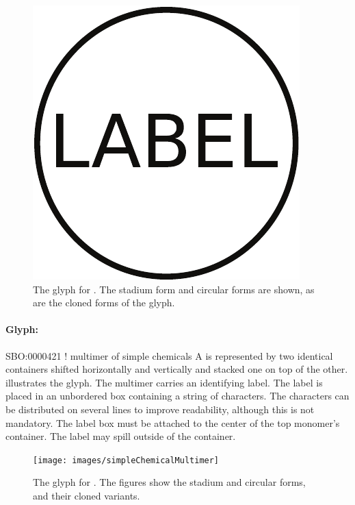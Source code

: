 \begin{figure}[htb]
  \centering
  \includegraphics[scale = 0.3]{images/simpleChemical}
  \caption{The \PD glyph for . The stadium
    form and circular forms are shown, as are the cloned forms of the glyph.}
  \label{fig:techref:simpleChemical}
\end{figure}

\paragraph{Glyph: }

\begin{glyphDescription}
\glyphSboTerm SBO:0000421 ! multimer of simple chemicals
\glyphContainer  A  is represented by two identical containers shifted horizontally and vertically and stacked one on top of the other.   illustrates the glyph.
\glyphLabel The multimer carries an identifying label.  The label is placed in an unbordered box containing a string of characters.  The characters can be distributed on several lines to improve readability, although this is not mandatory.  The label box must be attached to the center of the top monomer's container.  The label may spill outside of the container.
\end{glyphDescription}

\begin{figure}[htb]
  \centering
  \texttt{[image: images/simpleChemicalMultimer]}
  \caption{The \PD glyph for . The
    figures show the stadium and circular forms, and their cloned variants.}
  \label{fig:techref:simpleChemicalMultimer}
\end{figure}

